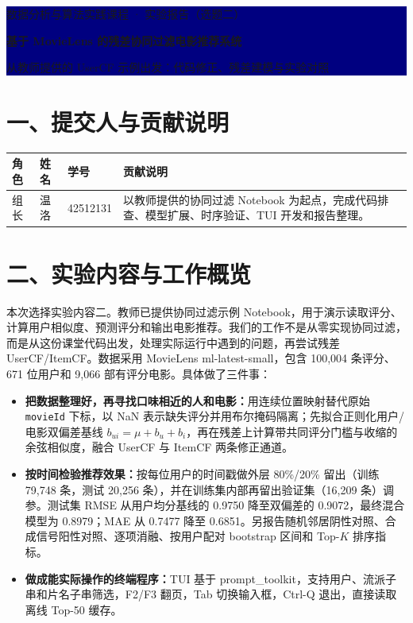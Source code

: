 \documentclass[10pt,a4paper]{article}
\newcommand{\term}[1]{\textbf{\color{navy}#1}}
\newcommand{\code}[1]{\texttt{#1}}
\begin{document}
\thispagestyle{empty}
\noindent\colorbox{navy}{\parbox{\dimexpr\textwidth-2\fboxsep}{%
\vspace{5mm}\color{white}\centering
{\large 数据分析与算法实践课程 · 实验报告（选题二）\par}
\vspace{5mm}
{\LARGE\bfseries 基于 MovieLens 的残差协同过滤电影推荐系统\par}
\vspace{3mm}
{\large 从教师提供的 UserCF 示例出发：代码修正、残差建模与实验对照\par}
\vspace{5mm}}}

\vspace{5mm}
\section*{一、提交人与贡献说明}
\begin{center}
\small
\begin{tabularx}{\textwidth}{P{18mm}P{24mm}P{30mm}Y}
\toprule
\term{角色} & \term{姓名} & \term{学号} & \term{贡献说明}\\
\midrule
组长 & 温洛 & 42512131 & 以教师提供的协同过滤 Notebook 为起点，完成代码排查、模型扩展、时序验证、TUI 开发和报告整理。\\
\bottomrule
\end{tabularx}
\end{center}

\section*{二、实验内容与工作概览}
本次选择实验内容二。教师已提供协同过滤示例 Notebook，用于演示读取评分、计算用户相似度、预测评分和输出电影推荐。我们的工作不是从零实现协同过滤，而是从这份课堂代码出发，处理实际运行中遇到的问题，再尝试残差 UserCF/ItemCF。数据采用 MovieLens ml-latest-small，包含 100,004 条评分、671 位用户和 9,066 部有评分电影。具体做了三件事：
\begin{itemize}
\item \term{把数据整理好，再寻找口味相近的人和电影：}用连续位置映射替代原始 \code{movieId} 下标，以 NaN 表示缺失评分并用布尔掩码隔离；先拟合正则化用户/电影双偏差基线 $b_{ui}=\mu+b_u+b_i$，再在残差上计算带共同评分门槛与收缩的余弦相似度，融合 UserCF 与 ItemCF 两条修正通道。
\item \term{按时间检验推荐效果：}按每位用户的时间戳做外层 80\%/20\% 留出（训练 79,748 条，测试 20,256 条），并在训练集内部再留出验证集（16,209 条）调参。测试集 RMSE 从用户均分基线的 0.9750 降至双偏差的 0.9072，最终混合模型为 0.8979；MAE 从 0.7477 降至 0.6851。另报告随机邻居阴性对照、合成信号阳性对照、逐项消融、按用户配对 bootstrap 区间和 Top-$K$ 排序指标。
\item \term{做成能实际操作的终端程序：}TUI 基于 prompt\_toolkit，支持用户、流派子串和片名子串筛选，F2/F3 翻页，Tab 切换输入框，Ctrl-Q 退出，直接读取离线 Top-50 缓存。
\end{itemize}
\end{document}
